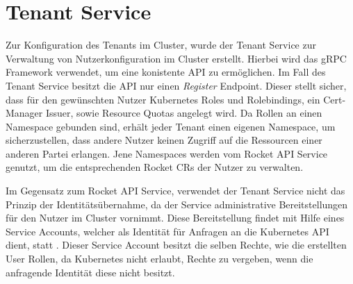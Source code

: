 \section{Tenant Service}
\label{sec:komponenten:tenant-service}
Zur Konfiguration des Tenants im Cluster, wurde der Tenant Service zur Verwaltung von Nutzerkonfiguration im Cluster erstellt.
Hierbei wird das gRPC Framework verwendet, um eine konistente API zu ermöglichen. Im Fall des Tenant Service
besitzt die API nur einen \emph{Register} Endpoint. Dieser stellt sicher, dass für den gewünschten Nutzer 
Kubernetes Roles und Rolebindings, ein Cert-Manager Issuer, sowie Resource Quotas angelegt wird. 
Da Rollen an einen Namespace gebunden sind, erhält jeder Tenant einen eigenen Namespace, um sicherzustellen,
dass andere Nutzer keinen Zugriff auf die Ressourcen einer anderen Partei erlangen.
Jene Namespaces werden vom Rocket API Service genutzt, um die entsprechenden Rocket \acp{CR} der Nutzer zu verwalten. 

Im Gegensatz zum Rocket API Service, verwendet der Tenant Service nicht das Prinzip der Identitätsübernahme, da
der Service administrative Bereitstellungen für den Nutzer im Cluster vornimmt. 
Diese Bereitstellung findet mit Hilfe eines Service Accounts, welcher als Identität für Anfragen 
an die Kubernetes API dient, statt . Dieser Service Account besitzt die selben Rechte,
wie die erstellten User Rollen, da Kubernetes nicht erlaubt, Rechte zu vergeben, wenn die anfragende Identität
diese nicht besitzt.

